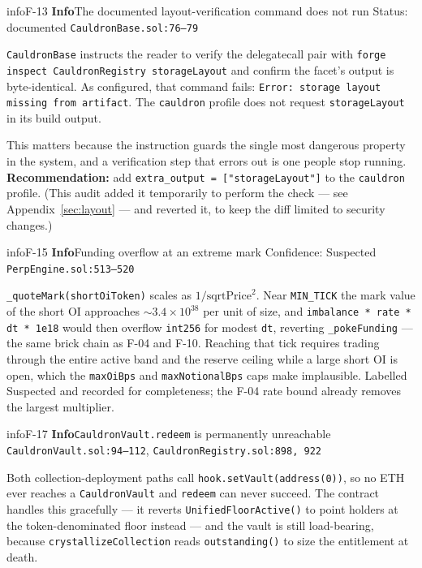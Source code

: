 \documentclass[11pt,a4paper]{article}
\newcommand{\Susp}{\textcolor{medium}{Suspected}}
\newcommand{\code}[1]{\texttt{\small #1}}
\newcommand{\fileref}[1]{\texttt{\scriptsize #1}}
\begin{document}
\begin{findingbox}{info}{F-13 \quad \textbf{Info}\quad The documented layout-verification command does not run \quad Status: documented}
\fileref{CauldronBase.sol:76--79}
\end{findingbox}
\code{CauldronBase} instructs the reader to verify the delegatecall pair with
\code{forge inspect CauldronRegistry storageLayout} and confirm the facet's output
is byte-identical. As configured, that command fails:
\code{Error: storage layout missing from artifact}. The \code{cauldron} profile does
not request \code{storageLayout} in its build output.

This matters because the instruction guards the single most dangerous property in
the system, and a verification step that errors out is one people stop running.
\textbf{Recommendation:} add \code{extra\_output = ["storageLayout"]} to the
\code{cauldron} profile. (This audit added it temporarily to perform the check ---
see Appendix~\ref{sec:layout} --- and reverted it, to keep the diff limited to
security changes.)

\begin{findingbox}{info}{F-15 \quad \textbf{Info}\quad Funding overflow at an extreme mark \quad Confidence: Suspected}
\fileref{PerpEngine.sol:513--520}
\end{findingbox}
\code{\_quoteMark(shortOiToken)} scales as $1/\mathrm{sqrtPrice}^2$. Near
\code{MIN\_TICK} the mark value of the short OI approaches ${\sim}3.4\times10^{38}$
per unit of size, and \code{imbalance * rate * dt * 1e18} would then overflow
\code{int256} for modest \code{dt}, reverting \code{\_pokeFunding} --- the same brick
chain as F-04 and F-10. Reaching that tick requires trading through the entire
active band and the reserve ceiling while a large short OI is open, which the
\code{maxOiBps} and \code{maxNotionalBps} caps make implausible. Labelled
\Susp{} and recorded for completeness; the F-04 rate bound already removes the
largest multiplier.

\begin{findingbox}{info}{F-17 \quad \textbf{Info}\quad \code{CauldronVault.redeem} is permanently unreachable}
\fileref{CauldronVault.sol:94--112}, \fileref{CauldronRegistry.sol:898, 922}
\end{findingbox}
Both collection-deployment paths call \code{hook.setVault(address(0))}, so no ETH
ever reaches a \code{CauldronVault} and \code{redeem} can never succeed. The
contract handles this gracefully --- it reverts \code{UnifiedFloorActive()} to point
holders at the token-denominated floor instead --- and the vault is still
load-bearing, because \code{crystallizeCollection} reads \code{outstanding()} to
size the entitlement at death.
\end{document}
